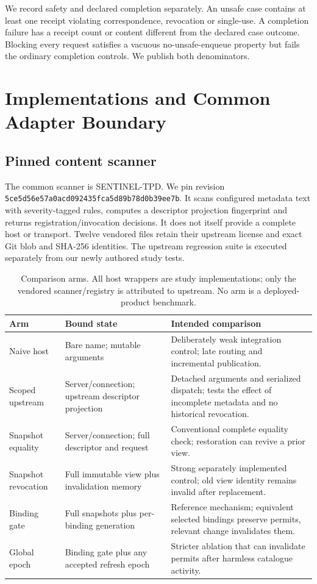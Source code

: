 We record safety and declared completion separately. An unsafe case contains at
least one receipt violating correspondence, revocation or single-use. A completion
failure has a receipt count or content different from the declared case outcome.
Blocking every request satisfies a vacuous no-unsafe-enqueue property but fails the
ordinary completion controls. We publish both denominators.

\section{Implementations and Common Adapter Boundary}
\subsection{Pinned content scanner}
The common scanner is SENTINEL-TPD. We pin revision
{\footnotesize\texttt{5ce5d56e57a0acd092435fca5d89b78d0b39ee7b}}.
It scans configured metadata text
with severity-tagged rules, computes a descriptor projection fingerprint and returns
registration/invocation decisions. It does not itself provide a complete host or
transport. Twelve vendored files retain their upstream license and exact Git blob
and SHA-256 identities. The upstream regression suite is executed separately from
our newly authored study tests.

\begin{table}[t]
\caption{Comparison arms. All host wrappers are study implementations; only the
vendored scanner/registry is attributed to upstream. No arm is a deployed-product benchmark.}
\label{tab:arms}
\centering\small
\begin{tabular}{p{}p{}p{}}
\hline
Arm & Bound state & Intended comparison \\
\hline
Naive host & Bare name; mutable arguments & Deliberately weak integration control; late routing and incremental publication. \\
Scoped upstream & Server/connection; upstream descriptor projection & Detached arguments and serialized dispatch; tests the effect of incomplete metadata and no historical revocation. \\
Snapshot equality & Server/connection; full descriptor and request & Conventional complete equality check; restoration can revive a prior view. \\
Snapshot revocation & Full immutable view plus invalidation memory & Strong separately implemented control; old view identity remains invalid after replacement. \\
Binding gate & Full snapshots plus per-binding generation & Reference mechanism; equivalent selected bindings preserve permits, relevant change invalidates them. \\
Global epoch & Binding gate plus any accepted refresh epoch & Stricter ablation that can invalidate permits after harmless catalogue activity. \\
\hline
\end{tabular}
\end{table}


